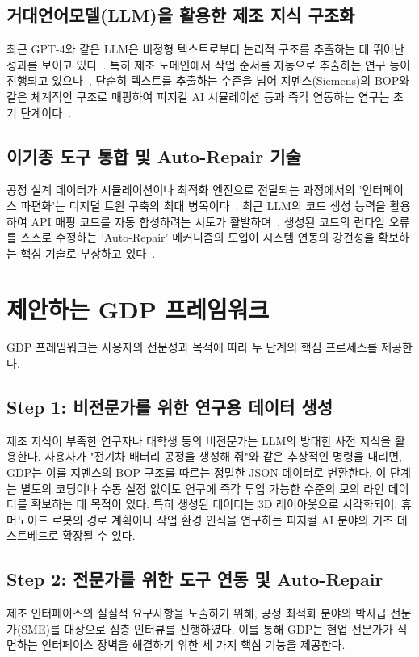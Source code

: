 \documentclass[conference]{IEEEtran}
\begin{document}
\subsection{거대언어모델(LLM)을 활용한 제조 지식 구조화}
최근 GPT-4와 같은 LLM은 비정형 텍스트로부터 논리적 구조를 추출하는 데 뛰어난 성과를 보이고 있다~\cite{b6}. 특히 제조 도메인에서 작업 순서를 자동으로 추출하는 연구 등이 진행되고 있으나~\cite{b7}, 단순히 텍스트를 추출하는 수준을 넘어 지멘스(Siemens)의 BOP와 같은 체계적인 구조로 매핑하여 피지컬 AI 시뮬레이션 등과 즉각 연동하는 연구는 초기 단계이다~\cite{b8, b9}.

\subsection{이기종 도구 통합 및 Auto-Repair 기술}
공정 설계 데이터가 시뮬레이션이나 최적화 엔진으로 전달되는 과정에서의 '인터페이스 파편화'는 디지털 트윈 구축의 최대 병목이다~\cite{b10}. 최근 LLM의 코드 생성 능력을 활용하여 API 매핑 코드를 자동 합성하려는 시도가 활발하며~\cite{b12, b13}, 생성된 코드의 런타임 오류를 스스로 수정하는 'Auto-Repair' 메커니즘의 도입이 시스템 연동의 강건성을 확보하는 핵심 기술로 부상하고 있다~\cite{b14}.

\section{제안하는 GDP 프레임워크}

GDP 프레임워크는 사용자의 전문성과 목적에 따라 두 단계의 핵심 프로세스를 제공한다.

\subsection{Step 1: 비전문가를 위한 연구용 데이터 생성}
제조 지식이 부족한 연구자나 대학생 등의 비전문가는 LLM의 방대한 사전 지식을 활용한다. 사용자가 "전기차 배터리 공정을 생성해 줘"와 같은 추상적인 명령을 내리면, GDP는 이를 지멘스의 BOP 구조를 따르는 정밀한 JSON 데이터로 변환한다. 이 단계는 별도의 코딩이나 수동 설정 없이도 연구에 즉각 투입 가능한 수준의 모의 라인 데이터를 확보하는 데 목적이 있다. 특히 생성된 데이터는 3D 레이아웃으로 시각화되어, 휴머노이드 로봇의 경로 계획이나 작업 환경 인식을 연구하는 피지컬 AI 분야의 기초 테스트베드로 확장될 수 있다.

\subsection{Step 2: 전문가를 위한 도구 연동 및 Auto-Repair}
제조 인터페이스의 실질적 요구사항을 도출하기 위해, 공정 최적화 분야의 박사급 전문가(SME)를 대상으로 심층 인터뷰를 진행하였다. 이를 통해 GDP는 현업 전문가가 직면하는 인터페이스 장벽을 해결하기 위한 세 가지 핵심 기능을 제공한다.
\end{document}
